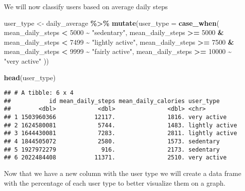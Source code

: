 \documentclass[
]{article}
\newenvironment{Shaded}{\begin{snugshade}}{\end{snugshade}}
\newcommand{\AttributeTok}[1]{\textcolor[rgb]{0.13,0.29,0.53}{#1}}
\newcommand{\DecValTok}[1]{\textcolor[rgb]{0.00,0.00,0.81}{#1}}
\newcommand{\FunctionTok}[1]{\textcolor[rgb]{0.13,0.29,0.53}{\textbf{#1}}}
\newcommand{\NormalTok}[1]{#1}
\newcommand{\OtherTok}[1]{\textcolor[rgb]{0.56,0.35,0.01}{#1}}
\newcommand{\SpecialCharTok}[1]{\textcolor[rgb]{0.81,0.36,0.00}{\textbf{#1}}}
\newcommand{\StringTok}[1]{\textcolor[rgb]{0.31,0.60,0.02}{#1}}
\begin{document}
We will now classify users based on average daily steps

\begin{Shaded}
\begin{Highlighting}[]
\NormalTok{user\_type }\OtherTok{\textless{}{-}}\NormalTok{ daily\_average }\SpecialCharTok{\%\textgreater{}\%}
  \FunctionTok{mutate}\NormalTok{(}\AttributeTok{user\_type =} \FunctionTok{case\_when}\NormalTok{(}
\NormalTok{    mean\_daily\_steps }\SpecialCharTok{\textless{}} \DecValTok{5000} \SpecialCharTok{\textasciitilde{}} \StringTok{"sedentary"}\NormalTok{,}
\NormalTok{    mean\_daily\_steps }\SpecialCharTok{\textgreater{}=} \DecValTok{5000} \SpecialCharTok{\&}\NormalTok{ mean\_daily\_steps }\SpecialCharTok{\textless{}} \DecValTok{7499} \SpecialCharTok{\textasciitilde{}} \StringTok{"lightly active"}\NormalTok{, }
\NormalTok{    mean\_daily\_steps }\SpecialCharTok{\textgreater{}=} \DecValTok{7500} \SpecialCharTok{\&}\NormalTok{ mean\_daily\_steps }\SpecialCharTok{\textless{}} \DecValTok{9999} \SpecialCharTok{\textasciitilde{}} \StringTok{"fairly active"}\NormalTok{, }
\NormalTok{    mean\_daily\_steps }\SpecialCharTok{\textgreater{}=} \DecValTok{10000} \SpecialCharTok{\textasciitilde{}} \StringTok{"very active"}
\NormalTok{  ))}

\FunctionTok{head}\NormalTok{(user\_type)}
\end{Highlighting}
\end{Shaded}

\begin{verbatim}
## # A tibble: 6 x 4
##           id mean_daily_steps mean_daily_calories user_type     
##        <dbl>            <dbl>               <dbl> <chr>         
## 1 1503960366           12117.               1816. very active   
## 2 1624580081            5744.               1483. lightly active
## 3 1644430081            7283.               2811. lightly active
## 4 1844505072            2580.               1573. sedentary     
## 5 1927972279             916.               2173. sedentary     
## 6 2022484408           11371.               2510. very active
\end{verbatim}

Now that we have a new column with the user type we will create a data
frame with the percentage of each user type to better visualize them on
a graph.
\end{document}
